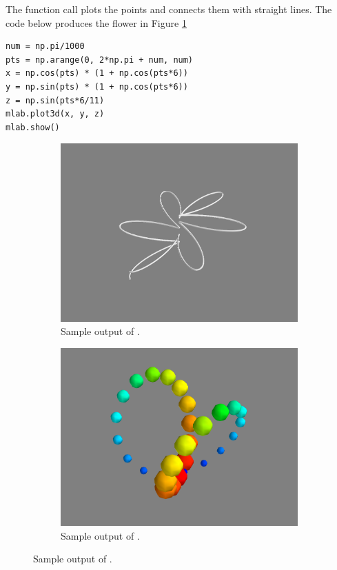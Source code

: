 The function call  plots the points  and connects them with straight lines.
The code below produces the flower in Figure \ref{fig:plot3d}

\begin{lstlisting}
num = np.pi/1000
pts = np.arange(0, 2*np.pi + num, num)
x = np.cos(pts) * (1 + np.cos(pts*6))
y = np.sin(pts) * (1 + np.cos(pts*6))
z = np.sin(pts*6/11)
mlab.plot3d(x, y, z)
mlab.show()
\end{lstlisting}

\begin{figure}
\captionsetup[subfigure]{justification=centering}
\centering
\begin{subfigure}{.5\textwidth}
    \centering
    \includegraphics[width=\linewidth]{plot3d.png}
    \caption{Sample output of .}
    \label{fig:plot3d}
\end{subfigure}%
\begin{subfigure}{.5\textwidth}
    \centering
    \includegraphics[width=\linewidth]{points3d.png}
    \caption{Sample output of .}
    \label{fig:points3d}
\end{subfigure}
\end{figure}

